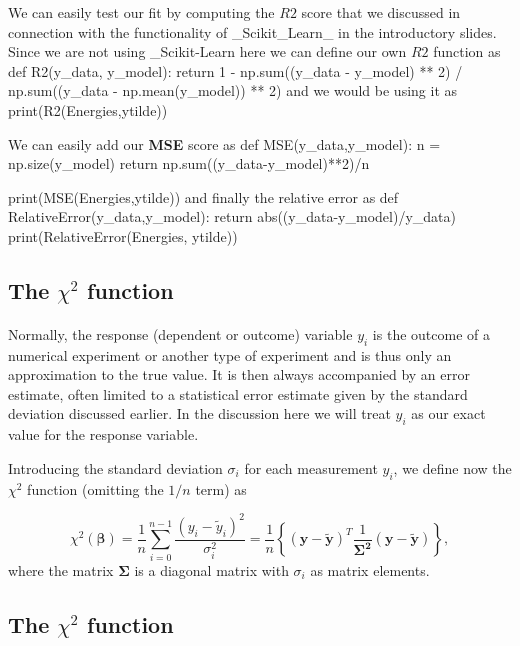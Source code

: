 \documentclass[%
oneside,                 %
final,                   %
10pt]{article}
\begin{document}
We can easily test our fit by computing the $R2$ score that we discussed in connection with the functionality of _Scikit_Learn_ in the introductory slides.
Since we are not using _Scikit-Learn here we can define our own $R2$ function as
\bpycod
def R2(y_data, y_model):
    return 1 - np.sum((y_data - y_model) ** 2) / np.sum((y_data - np.mean(y_model)) ** 2)
\epycod
and we would be using it as 
\bpycod
print(R2(Energies,ytilde))
\epycod

We can easily add our \textbf{MSE} score as
\bpycod
def MSE(y_data,y_model):
    n = np.size(y_model)
    return np.sum((y_data-y_model)**2)/n

print(MSE(Energies,ytilde))
\epycod
and finally the relative error as
\bpycod
def RelativeError(y_data,y_model):
    return abs((y_data-y_model)/y_data)
print(RelativeError(Energies, ytilde))
\epycod





\subsection{The $\chi^2$ function}

\paragraph{}

Normally, the response (dependent or outcome) variable $y_i$ is the
outcome of a numerical experiment or another type of experiment and is
thus only an approximation to the true value. It is then always
accompanied by an error estimate, often limited to a statistical error
estimate given by the standard deviation discussed earlier. In the
discussion here we will treat $y_i$ as our exact value for the
response variable.

Introducing the standard deviation $\sigma_i$ for each measurement
$y_i$, we define now the $\chi^2$ function (omitting the $1/n$ term)
as

\[
\chi^2(\bm{\beta})=\frac{1}{n}\sum_{i=0}^{n-1}\frac{\left(y_i-\tilde{y}_i\right)^2}{\sigma_i^2}=\frac{1}{n}\left\{\left(\bm{y}-\bm{\tilde{y}}\right)^T\frac{1}{\bm{\Sigma^2}}\left(\bm{y}-\bm{\tilde{y}}\right)\right\},
\]
where the matrix $\bm{\Sigma}$ is a diagonal matrix with $\sigma_i$ as matrix elements.



\subsection{The $\chi^2$ function}
\end{document}
